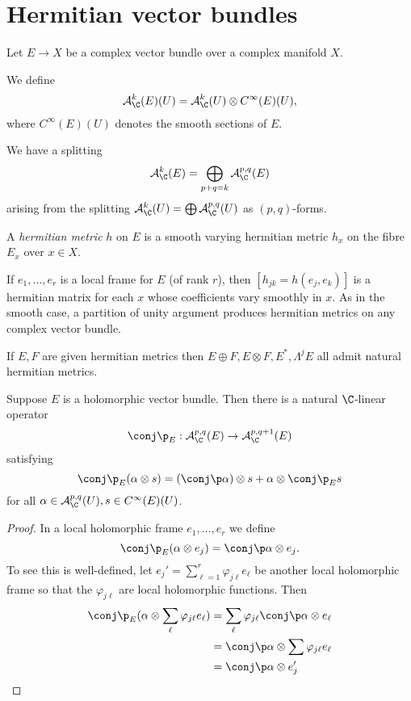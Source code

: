 \documentclass[a4paper]{article}
\begin{document}
\section{Hermitian vector bundles}

Let \(E \to X\) be a complex vector bundle over a complex manifold \(X\).

\begin{definition}
  We define
  \[
    \mathcal A_\C^k(E)(U) = \mathcal A_\C^k(U) \otimes C^\infty(E)(U),
  \]
  where \(C^\infty(E)(U)\) denotes the smooth sections of \(E\).
\end{definition}

We have a splitting
\[
  \mathcal A_\C^k(E) = \bigoplus_{p + q = k} \mathcal A_\C^{p, q}(E)
\]
arising from the splitting \(\mathcal A_\C^k(U) = \bigoplus \mathcal A_\C^{p, q}(U)\) as \((p, q)\)-forms.

\begin{definition}
  A \emph{hermitian metric} \(h\) on \(E\) is a smooth varying hermitian metric \(h_x\) on the fibre \(E_x\) over \(x \in X\).
\end{definition}
If \(e_1, \dots, e_r\) is a local frame for \(E\) (of rank \(r\)), then \([h_{jk} = h(e_j, e_k)]\) is a hermitian matrix for each \(x\) whose coefficients vary smoothly in \(x\). As in the smooth case, a partition of unity argument produces hermitian metrics on any complex vector bundle.

\begin{ex}
  If \(E, F\) are given hermitian metrics then \(E \oplus F, E \otimes F, E^*, \Lambda^j E\) all admit natural hermitian metrics.
\end{ex}

\begin{proposition}
  Suppose \(E\) is a holomorphic vector bundle. Then there is a natural \(\C\)-linear operator
  \[
    \conj \p_E: \mathcal A_\C^{p, q}(E) \to \mathcal A_\C^{p, q + 1}(E)
  \]
  satisfying
  \[
    \conj \p_E (\alpha \otimes s) = (\conj \p \alpha) \otimes s + \alpha \otimes \conj \p_E s
  \]
  for all \(\alpha \in \mathcal A_\C^{p, q}(U), s \in C^\infty(E)(U)\).
\end{proposition}

\begin{proof}
  In a local holomorphic frame \(e_1, \dots, e_r\) we define
  \[
    \conj \p_E (\alpha \otimes e_j) = \conj \p \alpha \otimes e_j.
  \]
  To see this is well-defined, let \(e_j' = \sum_{\ell = 1}^r \varphi_{j\ell} e_\ell\) be another local holomorphic frame so that the \(\varphi_{j \ell}\) are local holomorphic functions. Then
  \begin{align*}
    \conj \p_E(\alpha \otimes \sum_\ell \varphi_{j\ell} e_\ell)
    &= \sum_\ell \varphi_{j\ell} \conj \p \alpha \otimes e_\ell \\
    &= \conj \p \alpha \otimes \sum \varphi_{j \ell} e_\ell \\
    &= \conj \p \alpha \otimes e_j'
  \end{align*}
\end{proof}
\end{document}

